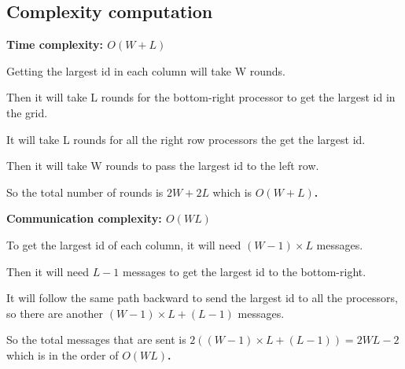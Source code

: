 \documentclass[paper=a4, fontsize=11pt]{scrartcl} %
\numberwithin{equation}{section} %
\numberwithin{figure}{section} %
\numberwithin{table}{section} %
\begin{document}
\subsection*{Complexity computation}
\textbf{Time complexity: $O(W + L)$}

Getting the largest id in each column will take W rounds.

Then it will take L rounds for the bottom-right processor to get the largest id in the grid.

It will take L rounds for all the right row processors the get the largest id.

Then it will take W rounds to pass the largest id to the left row.

So the total number of rounds is $2W + 2L$ which is \textbf{$O(W + L)$.}


\textbf{Communication complexity: $O(WL)$}

To get the largest id of each column, it will need $(W-1)\times L$ messages.

Then it will need $L - 1$ messages to get the largest id to the bottom-right.

It will follow the same path backward to send the largest id to all the processors, so there are another $(W-1)\times L + (L - 1)$ messages.

So the total messages that are sent is $2((W-1)\times L + (L - 1)) = 2WL - 2$ which is in the order of \textbf{$O(WL)$.}
\end{document}
